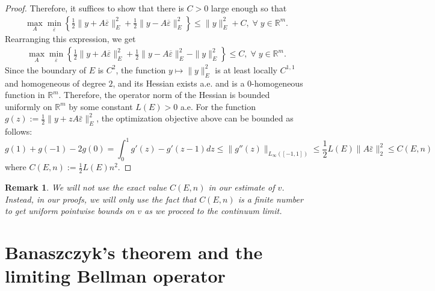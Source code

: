 \documentclass[reqno]{amsart}
\newtheorem{remark}[theorem]{Remark}
\numberwithin{equation}{section}
\newcommand{\R}{\mathbb R}
\newcommand{\eps}{\varepsilon}
\begin{document}
\begin{proof}
Therefore, it suffices to show that there is $C>0$ large enough so that 
\begin{align*}
  \max_A \min_{\overline \varepsilon} \left \{ \tfrac{1}{2}\|y+A\overline \varepsilon\|^2_E + \tfrac{1}{2}\|y-A\overline \varepsilon\|^2_E \right \} \leq \|y\|_E^2+C,\;\forall\;y \in \mathbb{R}^m.
\end{align*}
Rearranging this expression, we get
\begin{align*}
  \max_A \min_{\overline \varepsilon} \left \{ \tfrac{1}{2}\|y+A\overline \varepsilon\|^2_E + \tfrac{1}{2}\|y-A\overline \varepsilon\|^2_E - \|y\|_E^2\right \} \leq C,\;\forall\;y\in\mathbb{R}^m.
\end{align*}
Since the boundary of $E$ is $C^2$, the function $y\mapsto \|y\|_E^2$ is at least locally $C^{1,1}$ and homogeneous of degree $2$, and its Hessian exists a.e.  and is a $0$-homogeneous function in $\mathbb{R}^m$.  Therefore,  the operator norm of the Hessian is  bounded uniformly on $\R^m$ by some constant $L(E)>0$ a.e.
For the function  $g(z) :=\tfrac{1}{2}\|y+zA \bar \eps\|_E^2$, the  optimization objective above can be bounded as follows: 
 \[
 g(1)  +  g(-1) - 2g(0) = \int_0^1 g' (z) - g'(z-1) dz \leq \| g''(z)\|_{L_\infty([-1,1])}  \leq \frac{1}{2} L(E) \|A\bar \eps\|^2_{2}  \leq C(E,n)
 \]
 where $C(E,n) := \frac{1}{2} L(E) n^2$.
\end{proof}
    
\begin{remark}
  We will not use the exact value $C(E, n)$ in our  estimate of $v$. Instead,   in our proofs, we will only  use the fact that $C(E,n)$ is a finite number to get uniform pointwise bounds on $v$ as we proceed to the continuum limit.
\end{remark}


\section{Banaszczyk's theorem and the limiting Bellman operator}\label{s:Banaszczyk's theorem and the limiting Bellman operator}
\end{document}

